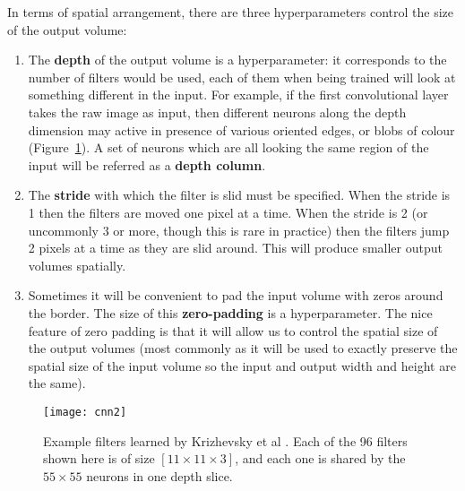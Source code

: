 In terms of spatial arrangement, there are three hyperparameters control the
size of the output volume:
\begin{enumerate}
    \item The \textbf{depth} of the output volume is a hyperparameter: it
    corresponds to the number of filters would be used, each of them when being
    trained will look at something different in the input. For example, if the
    first convolutional layer takes the raw image as input, then different
    neurons along the depth dimension may active in presence of various
    oriented edges, or blobs of colour (Figure~\ref{fig:alex_net_blob}). A set
    of neurons which are all looking the same region of the input will be
    referred as a \textbf{depth column}.
    \item The \textbf{stride} with which the filter is slid must be specified.
    When the stride is 1 then the filters are moved one pixel at a time. When
    the stride is 2 (or uncommonly 3 or more, though this is rare in practice)
    then the filters jump 2 pixels at a time as they are slid around. This will
    produce smaller output volumes spatially.
    \item Sometimes it will be convenient to pad the input volume with zeros
    around the border. The size of this \textbf{zero-padding} is a
    hyperparameter. The nice feature of zero padding is that it will allow us
    to control the spatial size of the output volumes (most commonly as it will
    be used to exactly preserve the spatial size of the input volume so the
    input and output width and height are the same).
\end{enumerate}
\begin{figure}[h]
    \centering
    \texttt{[image: cnn2]}
    \caption{
        Example filters learned by Krizhevsky et al
        \cite{Krizhevsky:2017:ICD:3098997.3065386}. Each of the 96 filters
        shown here is of size $[11\times11\times3]$, and each one is shared by
        the $55\times55$ neurons in one depth slice.
    }
    \label{fig:alex_net_blob}
\end{figure}


